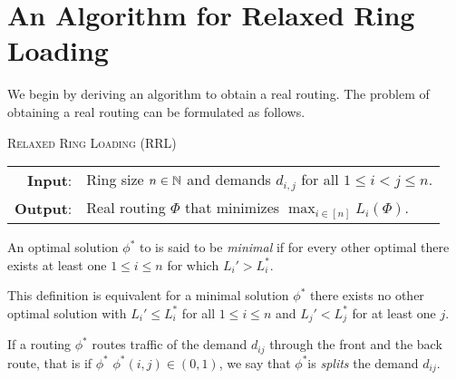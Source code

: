 \section{An Algorithm for Relaxed Ring Loading}
\label{sec:relaxed-ring-loading}

We begin by deriving an algorithm to obtain a real routing.
The problem of obtaining a real routing can be formulated as follows.
\begin{center}
	\begin{mdframed}
		\centering
		\textsc{Relaxed Ring Loading} (\textsc{RRL})\\[0.7em]
		\begin{tabular}{rl}
			{\bfseries Input}: & Ring size $n \in \mathbb{N}$ and demands $d_{i, j}$ for all $1 \leq i<j\leq n$.\\
			{\bfseries Output}: & Real routing $\Phi$ that minimizes $\max_{i \in [n]} L_i(\Phi)$.
		\end{tabular}
	\end{mdframed}
\end{center}


\begin{definition}
	An optimal solution $\phi^\ast$ to \RRL is said to be \emph{minimal} if for every other optimal there exists at least one $1 \leq i \leq n$ for which $L_i' > L_i^\ast$.
\end{definition}
This definition is equivalent for a minimal solution $\phi^\ast$ there exists no other optimal solution with $L_i' \leq L_i^\ast$ for all $1 \leq i \leq n$ and $L_j' < L_j^\ast$ for at least one $j$.

If a routing $\phi^\ast$ routes traffic of the demand $d_{ij}$ through the front and the back route, that is if $\phi^\ast$ $\phi^\ast(i, j) \in (0, 1)$, we say that $\phi^\ast$is \emph{splits} the demand $d_{ij}$.

